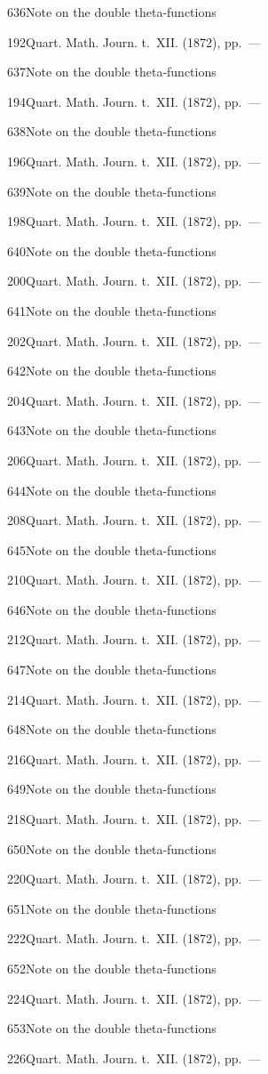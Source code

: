 \documentclass[11pt,a4paper]{book}
\providecommand{\tocentry}[2]{#1\dotfill #2\par}
\begin{document}
\tocentry{636}{Note on the double theta-functions}{192}{Quart. Math. Journ. t.~XII. (1872), pp.~---}

\tocentry{637}{Note on the double theta-functions}{194}{Quart. Math. Journ. t.~XII. (1872), pp.~---}

\tocentry{638}{Note on the double theta-functions}{196}{Quart. Math. Journ. t.~XII. (1872), pp.~---}

\tocentry{639}{Note on the double theta-functions}{198}{Quart. Math. Journ. t.~XII. (1872), pp.~---}

\newpage

\tocentry{640}{Note on the double theta-functions}{200}{Quart. Math. Journ. t.~XII. (1872), pp.~---}

\tocentry{641}{Note on the double theta-functions}{202}{Quart. Math. Journ. t.~XII. (1872), pp.~---}

\tocentry{642}{Note on the double theta-functions}{204}{Quart. Math. Journ. t.~XII. (1872), pp.~---}

\tocentry{643}{Note on the double theta-functions}{206}{Quart. Math. Journ. t.~XII. (1872), pp.~---}

\tocentry{644}{Note on the double theta-functions}{208}{Quart. Math. Journ. t.~XII. (1872), pp.~---}

\tocentry{645}{Note on the double theta-functions}{210}{Quart. Math. Journ. t.~XII. (1872), pp.~---}

\tocentry{646}{Note on the double theta-functions}{212}{Quart. Math. Journ. t.~XII. (1872), pp.~---}

\tocentry{647}{Note on the double theta-functions}{214}{Quart. Math. Journ. t.~XII. (1872), pp.~---}

\tocentry{648}{Note on the double theta-functions}{216}{Quart. Math. Journ. t.~XII. (1872), pp.~---}

\tocentry{649}{Note on the double theta-functions}{218}{Quart. Math. Journ. t.~XII. (1872), pp.~---}

\tocentry{650}{Note on the double theta-functions}{220}{Quart. Math. Journ. t.~XII. (1872), pp.~---}

\tocentry{651}{Note on the double theta-functions}{222}{Quart. Math. Journ. t.~XII. (1872), pp.~---}

\tocentry{652}{Note on the double theta-functions}{224}{Quart. Math. Journ. t.~XII. (1872), pp.~---}

\newpage

\tocentry{653}{Note on the double theta-functions}{226}{Quart. Math. Journ. t.~XII. (1872), pp.~---}
\end{document}
